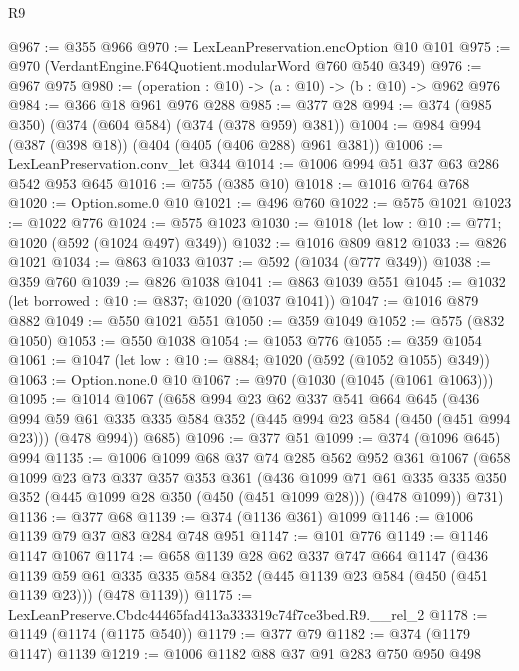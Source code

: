\begin{lexlean}{R9}
\begin{coremodule}
@967 := @355 @966
@970 := LexLeanPreservation.encOption @10 @101
@975 := @970 (VerdantEngine.F64Quotient.modularWord @760 @540 @349)
@976 := @967 @975
@980 := (operation : @10) -> (a : @10) -> (b : @10) -> @962 @976
@984 := @366 @18 @961 @976 @288
@985 := @377 @28
@994 := @374 (@985 @350) (@374 (@604 @584) (@374 (@378 @959) @381))
@1004 := @984 @994 (@387 (@398 @18)) (@404 (@405 (@406 @288) @961 @381))
@1006 := LexLeanPreservation.conv_let @344
@1014 := @1006 @994 @51 @37 @63 @286 @542 @953 @645
@1016 := @755 (@385 @10)
@1018 := @1016 @764 @768
@1020 := Option.some.{0} @10
@1021 := @496 @760
@1022 := @575 @1021
@1023 := @1022 @776
@1024 := @575 @1023
@1030 := @1018 (let low : @10 := @771; @1020 (@592 (@1024 @497) @349))
@1032 := @1016 @809 @812
@1033 := @826 @1021
@1034 := @863 @1033
@1037 := @592 (@1034 (@777 @349))
@1038 := @359 @760
@1039 := @826 @1038
@1041 := @863 @1039 @551
@1045 := @1032 (let borrowed : @10 := @837; @1020 (@1037 @1041))
@1047 := @1016 @879 @882
@1049 := @550 @1021 @551
@1050 := @359 @1049
@1052 := @575 (@832 @1050)
@1053 := @550 @1038
@1054 := @1053 @776
@1055 := @359 @1054
@1061 := @1047 (let low : @10 := @884; @1020 (@592 (@1052 @1055) @349))
@1063 := Option.none.{0} @10
@1067 := @970 (@1030 (@1045 (@1061 @1063)))
@1095 := @1014
    @1067
    (@658
      @994
      @23
      @62
      @337
      @541
      @664
      @645
      (@436
        @994
        @59
        @61
        @335
        @335
        @584
        @352
        (@445 @994 @23 @584 (@450 (@451 @994 @23)))
        (@478 @994))
      @685)
@1096 := @377 @51
@1099 := @374 (@1096 @645) @994
@1135 := @1006
    @1099
    @68
    @37
    @74
    @285
    @562
    @952
    @361
    @1067
    (@658
      @1099
      @23
      @73
      @337
      @357
      @353
      @361
      (@436
        @1099
        @71
        @61
        @335
        @335
        @350
        @352
        (@445 @1099 @28 @350 (@450 (@451 @1099 @28)))
        (@478 @1099))
      @731)
@1136 := @377 @68
@1139 := @374 (@1136 @361) @1099
@1146 := @1006 @1139 @79 @37 @83 @284 @748 @951
@1147 := @101 @776
@1149 := @1146 @1147 @1067
@1174 := @658
    @1139
    @28
    @62
    @337
    @747
    @664
    @1147
    (@436
      @1139
      @59
      @61
      @335
      @335
      @584
      @352
      (@445 @1139 @23 @584 (@450 (@451 @1139 @23)))
      (@478 @1139))
@1175 := LexLeanPreserve.Cbdc44465fad413a333319c74f7ce3bed.R9.__rel_2
@1178 := @1149 (@1174 (@1175 @540))
@1179 := @377 @79
@1182 := @374 (@1179 @1147) @1139
@1219 := @1006
    @1182
    @88
    @37
    @91
    @283
    @750
    @950
    @498

\end{coremodule}
\end{lexlean}
